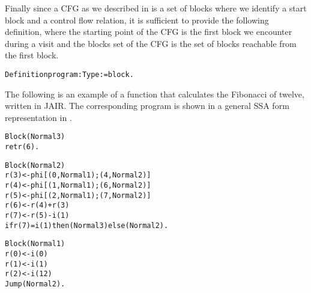 Finally since a CFG as we described in  is a set of blocks where we identify a start block and a control flow relation, it is sufficient to provide the following definition, where the starting point of the CFG is the first block we encounter during a visit and the blocks set of the CFG is the set of blocks reachable from the first block.

\begin{alltt}
Definition program : Type := block.
\end{alltt}

The following is an example of a function that calculates the Fibonacci of twelve, written in JAIR. The corresponding program is shown in a general SSA form representation in .

\begin{alltt}
Block (Normal 3)
  ret r(6).

Block (Normal 2)
  r(3) <- phi [(0, Normal 1); (4, Normal 2)]
  r(4) <- phi [(1, Normal 1); (6, Normal 2)]
  r(5) <- phi [(2, Normal 1); (7, Normal 2)]
  r(6) <- r(4) + r(3)
  r(7) <- r(5) - i(1)
  if r(7) = i(1) then (Normal 3) else (Normal 2).

Block (Normal 1)
  r(0) <- i(0)
  r(1) <- i(1)
  r(2) <- i(12)
  Jump (Normal 2).
\end{alltt}




